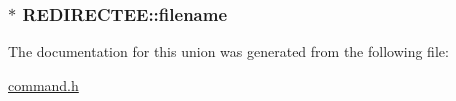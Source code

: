 \subsubsection[{\texorpdfstring{filename}{filename}}]{$\ast$ R\+E\+D\+I\+R\+E\+C\+T\+E\+E\+::filename}\hypertarget{unionREDIRECTEE_a5149629ee488bbd339dd6d7dbe38f212}{}\label{unionREDIRECTEE_a5149629ee488bbd339dd6d7dbe38f212}


The documentation for this union was generated from the following file\+:\begin{DoxyCompactItemize}
\item 
\hyperlink{command_8h}{command.\+h}\end{DoxyCompactItemize}
